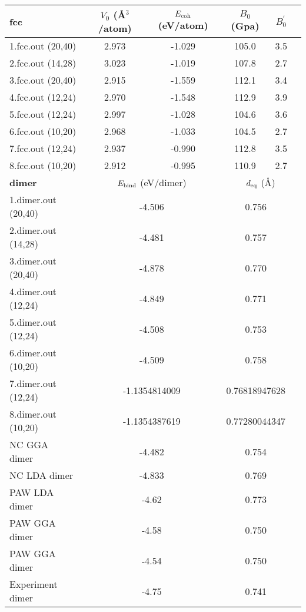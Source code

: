 \documentclass[onecolumn]{revtex4}
\begin{document}
\begin{center}
\begin{tabular}{lccccc}
\hline
\hline
\bf{fcc}&$V_0$ (\AA$^3$/atom)&$E_{\rm coh}$ (eV/atom)&$B_0$ (Gpa)&$B_0^{'}$& \\
\hline
1.fcc.out (20,40)& 2.973 &-1.029 & 105.0 & 3.5 & \\ 
2.fcc.out (14,28)& 3.023 &-1.019 & 107.8 & 2.7 & \\ 
3.fcc.out (20,40)& 2.915 &-1.559 & 112.1 & 3.4 & \\ 
4.fcc.out (12,24)& 2.970 &-1.548 & 112.9 & 3.9 & \\ 
5.fcc.out (12,24)& 2.997 &-1.028 & 104.6 & 3.6 & \\ 
6.fcc.out (10,20)& 2.968 &-1.033 & 104.5 & 2.7 & \\ 
7.fcc.out (12,24)& 2.937 &-0.990 & 112.8 & 3.5 & \\ 
8.fcc.out (10,20)& 2.912 &-0.995 & 110.9 & 2.7 & \\ 
\hline
\hline
\bf{dimer}&\multicolumn{2}{c}{$E_{\rm bind}$ (eV/dimer)}&\multicolumn{3}{c}{$d_{\rm eq}$ (\AA)} \\
\hline
1.dimer.out (20,40)&\multicolumn{2}{c}{-4.506}&\multicolumn{2}{c}{0.756} \\ 
2.dimer.out (14,28)&\multicolumn{2}{c}{-4.481}&\multicolumn{2}{c}{0.757} \\ 
3.dimer.out (20,40)&\multicolumn{2}{c}{-4.878}&\multicolumn{2}{c}{0.770} \\ 
4.dimer.out (12,24)&\multicolumn{2}{c}{-4.849}&\multicolumn{2}{c}{0.771} \\ 
5.dimer.out (12,24)&\multicolumn{2}{c}{-4.508}&\multicolumn{2}{c}{0.753} \\ 
6.dimer.out (10,20)&\multicolumn{2}{c}{-4.509}&\multicolumn{2}{c}{0.758} \\ 
7.dimer.out (12,24)&\multicolumn{2}{c}{-1.1354814009}&\multicolumn{2}{c}{0.76818947628} \\ 
8.dimer.out (10,20)&\multicolumn{2}{c}{-1.1354387619}&\multicolumn{2}{c}{0.77280044347} \\ 
NC GGA dimer~\cite{Tutorial2_ABINIT} & \multicolumn{2}{c}{-4.482} & \multicolumn{2}{c}{0.754} \\ %
NC LDA dimer~\cite{Tutorial2_ABINIT} & \multicolumn{2}{c}{-4.833} & \multicolumn{2}{c}{0.769} \\ %
PAW LDA dimer~\cite{Blochl_PRB50_1994} & \multicolumn{2}{c}{-4.62} & \multicolumn{2}{c}{0.773} \\ %
PAW GGA dimer~\cite{Kresse_SS459_2000} & \multicolumn{2}{c}{-4.58} & \multicolumn{2}{c}{0.750} \\ %
PAW GGA dimer~\cite{Jiang_PRB70_2004} & \multicolumn{2}{c}{-4.54} & \multicolumn{2}{c}{0.750} \\ %
Experiment dimer~\cite{Huber_1979} & \multicolumn{2}{c}{-4.75} & \multicolumn{2}{c}{0.741} \\ %
\hline
\hline
\end{tabular}
\end{center}
\end{document}
